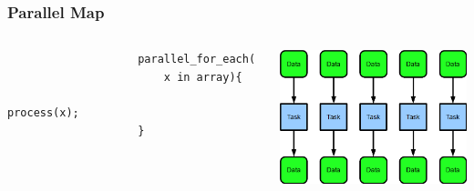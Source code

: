 \documentclass[xcolor=dvipsnames]{beamer}
\begin{document}
			
		\begin{frame}[fragile] \frametitle{Parallel Map}
			\begin{columns}
				\begin{column}{0.5\textwidth}
					\begin{verbatim}
					parallel_for_each(
					    x in array){
						        process(x);
					}
					\end{verbatim}
			    \end{column}
		  		\begin{column}{0.5\textwidth}
					\includegraphics[width=60mm]{images/map_parallel.png}
				\end{column}
			\end{columns}
		\end{frame}
			
\end{document}
